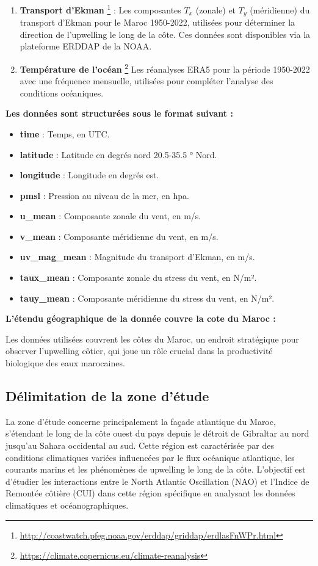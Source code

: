 \begin{enumerate}

    \item \textbf{Transport d'Ekman} \footnote{\url{http://coastwatch.pfeg.noaa.gov/erddap/griddap/erdlasFnWPr.html}} : Les composantes $T_x$ (zonale) et $T_y$ (méridienne) du transport d'Ekman pour le Maroc 1950-2022, utilisées pour déterminer la direction de l'upwelling le long de la côte. Ces données sont disponibles via la plateforme ERDDAP de la NOAA.
    \item \textbf{Température de l'océan} \footnote{\url{https://climate.copernicus.eu/climate-reanalysis}} Les réanalyses ERA5 pour la période 1950-2022 avec une fréquence mensuelle, utilisées pour compléter l'analyse des conditions océaniques.
\end{enumerate}
\vspace{1cm}
\textbf{Les données sont structurées sous le format suivant :}
\begin{itemize}
    \item \textbf{time} : Temps, en UTC.
    \item \textbf{latitude} : Latitude en degrés nord 20.5-35.5 ° Nord.
    \item \textbf{longitude} : Longitude en degrés est.
    \item \textbf{pmsl} : Pression au niveau de la mer, en hpa.
    \item \textbf{u\_mean} : Composante zonale du vent, en m/s.
    \item \textbf{v\_mean} : Composante méridienne du vent, en m/s.
    \item \textbf{uv\_mag\_mean} : Magnitude du transport d'Ekman, en m/s.
    \item \textbf{taux\_mean} : Composante zonale du stress du vent, en N/m².
    \item \textbf{tauy\_mean} : Composante méridienne du stress du vent, en N/m².
\end{itemize}

\textbf{L'étendu géographique de la donnée couvre la cote du Maroc  :}

Les données utilisées couvrent les côtes du Maroc, un endroit stratégique pour observer l'upwelling côtier, qui joue un rôle crucial dans la productivité biologique des eaux marocaines.

\subsection{Délimitation de la zone d'étude}
La zone d'étude concerne principalement la façade atlantique du Maroc, s'étendant le long de la côte ouest du pays depuis le détroit de Gibraltar au nord jusqu'au Sahara occidental au sud. Cette région est caractérisée par des conditions climatiques variées influencées par le flux océanique atlantique, les courants marins et les phénomènes de upwelling le long de la côte. L'objectif est d'étudier les interactions entre le North Atlantic Oscillation (NAO) et l'Indice de Remontée côtière (CUI) dans cette région spécifique en analysant les données climatiques et océanographiques.

